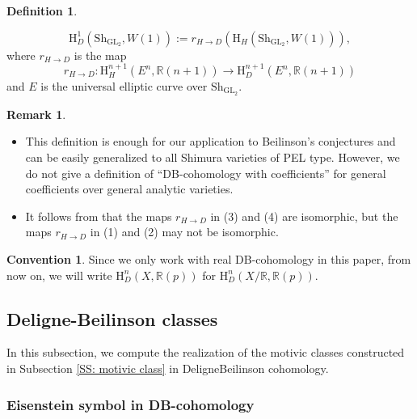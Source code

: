 \documentclass[11pt, a4paper]{amsart}
\theoremstyle{plain}
\theoremstyle{definition}
\newtheorem{definition}[theorem]{Definition}
\newtheorem{remark}[theorem]{Remark}
\newtheorem{convention}[theorem]{Convention}
\numberwithin{equation}{section}
\def\RR{\mathbb{R}}
\DeclareMathOperator{\GL}{\mathrm{GL}}
\newcommand{\Sh}{\mathrm{Sh}}
\begin{document}
\begin{definition}
\begin{enumerate}
              \begin{equation*}
                    \mathrm{H}^{1}_{D}(\Sh_{\GL_2}, W(1)) := r_{H \rightarrow D}(\mathrm{H}_{H}(\Sh_{\GL_2}, W(1))), 
              \end{equation*}
              where $r_{H \rightarrow D}$ is the map 
              \begin{equation*}
                  r_{H \rightarrow D} \colon \mathrm{H}^{n + 1}_{H} (E^{n}, \RR(n + 1)) \rightarrow \mathrm{H}^{n + 1}_{D} (E^{n}, \RR(n + 1))
              \end{equation*}
              and $E$ is the universal elliptic curve over $\Sh_{\GL_2}$.
    \end{enumerate}
\end{definition}

\begin{remark}
    \begin{itemize}
        \item This definition is enough for our application to Beilinson's conjectures and can be easily generalized to all Shimura varieties of PEL type. However, we do not give a definition of ``DB-cohomology with coefficients'' for general coefficients over general analytic varieties. 
        \item It follows from \cite[Page 60]{Bei83} that the maps $r_{H \rightarrow D}$ in (3) and (4) are isomorphic, but the maps $r_{H \rightarrow D}$ in (1) and (2) may not be isomorphic. 
    \end{itemize}
\end{remark}

\begin{convention}
    Since we only work with real DB-cohomology in this paper, from now on, we will write $\mathrm{H}_{D}^{n}(X, \RR(p))$ for 
    $\mathrm{H}_{D}^{n}(X/\RR, \RR(p))$. 
\end{convention}

 \subsection{Deligne-Beilinson classes}
 \label{SS: Eis symbol and Hodge realization}
 In this subsection, we compute the realization of the motivic classes constructed in Subsection \ref{SS: motivic class} in Deligne{\textendash}Beilinson cohomology. 

\subsubsection{Eisenstein symbol in DB-cohomology}
\end{document}
